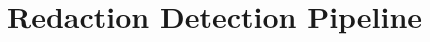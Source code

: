 \documentclass[12pt]{article}
\begin{document}
\section*{Redaction Detection Pipeline}





\newpage
\end{document}
